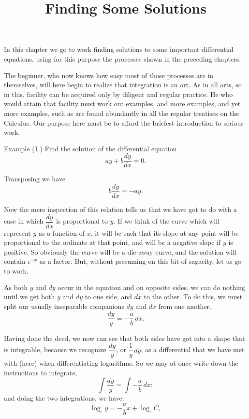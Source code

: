 \documentclass{ximera}
\title{Finding Some Solutions}
\begin{document}
\begin{abstract}
\end{abstract}
\maketitle

In this chapter we go to work finding solutions to
some important differential equations, using for this
purpose the processes shown in the preceding chapters.

The beginner, who now knows how easy most of
those processes are in themselves, will here begin to
realize that integration is an art. As in all arts, so
in this, facility can be acquired only by diligent and
regular practice. He who would attain that facility
must work out examples, and more examples, and yet
more examples, such as are found abundantly in all
the regular treatises on the Calculus. Our purpose
here must be to afford the briefest introduction to
serious work.

Example (1.) Find the solution of the differential
equation
\[
ay + b \frac{dy}{dx} = 0.
\]

Transposing we have
\[
b \frac{dy}{dx} = -ay.
\]


Now the mere inspection of this relation tells us
that we have got to do with a case in which $\dfrac{dy}{dx}$ is
proportional to $y$. If we think of the curve which
will represent $y$ as a function of $x$, it will be such
that its slope at any point will be proportional to
the ordinate at that point, and will be a negative
slope if $y$ is positive. So obviously the curve will
be a die-away curve, and the solution will
contain $\epsilon^{-x}$ as a factor. But, without presuming on
this bit of sagacity, let us go to work.

As both $y$ and $dy$ occur in the equation and on
opposite sides, we can do nothing until we get both
$y$ and $dy$ to one side, and $dx$ to the other. To do
this, we must split our usually inseparable companions
$dy$ and $dx$ from one another.
\[
\frac{dy}{y} = - \frac{a}{b}\, dx.
\]

Having done the deed, we now can see that both
sides have got into a shape that is integrable, because
we recognize $\dfrac{dy}{y}$, or $\dfrac{1}{y}\, dy$, as a differential that we
have met with (here) when differentiating logarithms.
So we may at once write down the instructions to
integrate,
\[
\int \frac{dy}{y} = \int -\frac{a}{b}\, dx;
\]
and doing the two integrations, we have:
\[
\log_\epsilon y = -\frac{a}{b} x + \log_\epsilon C,
\]
\end{document}
